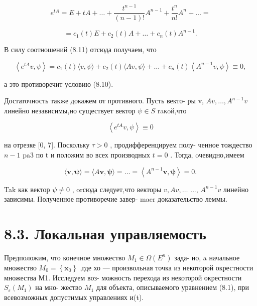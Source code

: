 \documentclass[8pt]{extarticle}
\begin{document}
\[
{e}^{tA} = E + {tA} + \ldots  + \frac{{t}^{n - 1}}{\left( {n - 1}\right) !}{A}^{n - 1} + \frac{{t}^{n}}{n!}{A}^{n} + \ldots  =
\]

\[
= {c}_{1}\left( t\right) E + {c}_{2}\left( t\right) A + \ldots  + {c}_{n}\left( t\right) {A}^{n - 1}.
\]

В силу соотношений (8.11) отсюда получаем, что

\[
\left\langle  {{e}^{tA}v,\psi }\right\rangle   = {c}_{1}\left( t\right) \langle v,\psi \rangle  + {c}_{2}\left( t\right) \langle {Av},\psi \rangle  + \ldots  + {c}_{n}\left( t\right) \left\langle  {{A}^{n - 1}v,\psi }\right\rangle   \equiv  0,
\]

а это противоречит условию (8.10).

Достаточность также докажем от противного. Пусть векто- ры v, \({Av},\ldots ,{A}^{n - 1}v\) линейно независимы,но существует вектор \(\psi  \in  S\) raκoй,что

\[
\left\langle  {{e}^{tA}v,\psi }\right\rangle   \equiv  0
\]

на отрезке [0, 7]. Поскольку \(\tau  > 0\) , продифференцируем полу- ченное тождество \(n - 1\) pa3 по t и положим во всех производных \(t = 0\) . Тогда, oчевидно,имеем

\[
\langle \mathbf{v},\mathbf{\psi }\rangle  = \langle A\mathbf{v},\mathbf{\psi }\rangle  = \ldots  = \left\langle  {{A}^{n - 1}\mathbf{v},\mathbf{\psi }}\right\rangle   = 0.
\]

Tak как вектор \(\psi  \neq  0\) , orсюда следует,что векторы \(v,{Av},\ldots\) ..., \({A}^{n - 1}v\) линейно зависимы. Полученное противоречие завер- maer доказательство леммы.

\section*{8.3. Локальная управляемость}

Предположим, что конечное множество \({M}_{1} \in  \Omega \left( {E}^{n}\right)\) зада- но, a начальное множество \({M}_{0} = \left\{  {\mathbf{x}}_{0}\right\}\) ,где хо — произвольная точка из некоторой окрестности множества М1. Исследуем воз- можность перехода из некоторой окрестности \({S}_{\varepsilon }\left( {M}_{1}\right)\) на мно- жество \({M}_{1}\) для объекта, описываемого уравнением (8.1), при всевозможных допустимых управлениях и(t).
\end{document}
